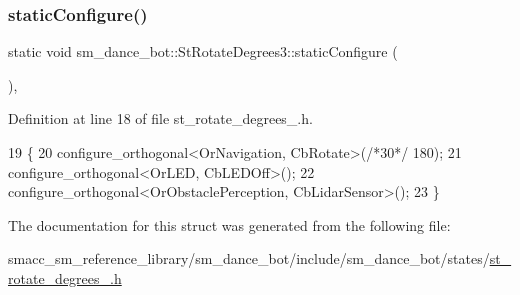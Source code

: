 \subsubsection{\texorpdfstring{static\+Configure()}{staticConfigure()}}
{\footnotesize\ttfamily static void sm\+\_\+dance\+\_\+bot\+::\+St\+Rotate\+Degrees3\+::static\+Configure (\begin{DoxyParamCaption}{ }\end{DoxyParamCaption})\hspace{0.3cm}{\ttfamily [inline]}, {\ttfamily [static]}}



Definition at line 18 of file st\+\_\+rotate\+\_\+degrees\+\_.\+h.


\begin{DoxyCode}
19   \{
20     configure\_orthogonal<OrNavigation, CbRotate>(\textcolor{comment}{/*30*/} 180);
21     configure\_orthogonal<OrLED, CbLEDOff>();
22     configure\_orthogonal<OrObstaclePerception, CbLidarSensor>();
23   \}
\end{DoxyCode}


The documentation for this struct was generated from the following file\+:\begin{DoxyCompactItemize}
\item 
smacc\+\_\+sm\+\_\+reference\+\_\+library/sm\+\_\+dance\+\_\+bot/include/sm\+\_\+dance\+\_\+bot/states/\hyperlink{sm__dance__bot_2include_2sm__dance__bot_2states_2st__rotate__degrees__3_8h}{st\+\_\+rotate\+\_\+degrees\+\_.\+h}\end{DoxyCompactItemize}
